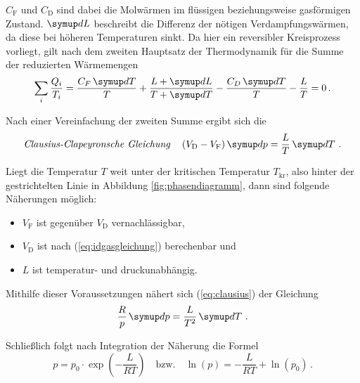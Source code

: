 $C_\text{F}$ und $C_\text{D}$ sind dabei die Molwärmen im flüssigen beziehungsweise gasförmigen Zustand.
$\dif{L}$ beschreibt die Differenz der nötigen Verdampfungswärmen, da diese bei höheren Temperaturen sinkt.
Da hier ein reversibler Kreisprozess vorliegt, gilt nach dem zweiten Hauptsatz der Thermodynamik für 
die Summe der reduzierten Wärmemengen
\begin{equation}
    \sum_{i} \frac{Q_{i}}{T_{i}} = 
    \frac {C_{F}\dif{T}} {T} + \frac {L+\dif{L}} {T+\dif{T}} - \frac {C_{D}\dif{T}} {T}-\frac{L}{T} =
    0 \, .
\end{equation}

Nach einer Vereinfachung der zweiten Summe ergibt sich die 
\begin{equation}
    \text{\textit{Clausius-Clapeyronsche Gleichung}} \quad \left(V_{\text{D}}-V_{\text{F}}\right) \dif{p} = \frac{L}{T} \dif{T} \, . 
    \label{eq:clausius}
\end{equation}

Liegt die Temperatur $T$ weit unter der kritischen Temperatur $T_\text{kr}$, also hinter der gestrichtelten Linie in Abbildung \ref{fig:phasendiagramm},
dann sind folgende Näherungen möglich:
\begin{itemize}
    \item $V_\text{F}$ ist gegenüber $V_\text{D}$ vernachlässigbar,
    \item $V_\text{D}$ ist nach (\ref{eq:idgasgleichung}) berechenbar und
    \item $L$ ist temperatur- und druckunabhängig.
\end{itemize}

Mithilfe dieser Voraussetzungen nähert sich (\ref{eq:clausius}) der Gleichung
\begin{equation}
    \frac{R}{p} \dif{p} = \frac{L}{T^2} \dif{T} \, . 
    \label{eq:approxclausius}
\end{equation}

Schließlich folgt nach Integration der Näherung die Formel
\begin{equation}
    p = p_{0} \cdot \exp \left(-\frac{L}{R T}\right) \quad \text{bzw.} \quad \ln(p)= -\frac{L}{R T} + \ln(p_{0}) \, .
    \label{eq:damppfdruck}
\end{equation}